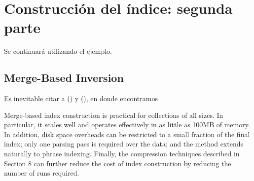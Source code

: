 \section{Construcción del índice: segunda parte}\label{sec:indice2}

Se continuará utilizando el ejemplo.

\subsection{Merge-Based Inversion}

Es inevitable citar a \citet[p. ~14]{Zobel06invertedfiles} (\citeyear{Zobel06invertedfiles}) y \citet[p.~238]{WittenMoffatBell99} (\citeyear{WittenMoffatBell99}), en donde encontramos

Merge-based index construction is practical for collections of all sizes. In particular,
it scales well and operates effectively in as little as 100MB of memory. In addition, disk
space overheads can be restricted to a small fraction of the final index; only one parsing
pass is required over the data; and the method extends naturally to phrase indexing.
Finally, the compression techniques described in Section 8 can further reduce the cost
of index construction by reducing the number of runs required.





